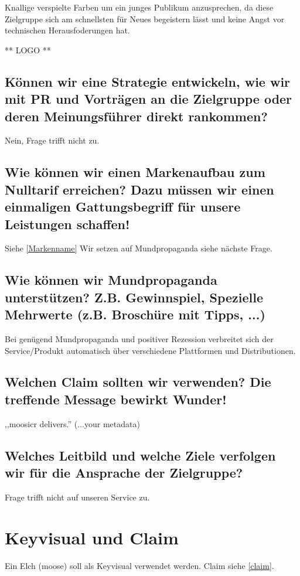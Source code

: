 \documentclass[11pt]{scrreprt}
\begin{document}
Knallige verspielte Farben um ein junges Publikum anzusprechen, da diese
Zielgruppe sich am schnellsten für Neues begeistern lässt und keine Angst vor
technischen Herausfoderungen hat.

** LOGO **

\section{Können wir eine Strategie entwickeln, wie wir
mit PR und Vorträgen an die Zielgruppe oder
deren Meinungsführer direkt rankommen?}

Nein, Frage trifft nicht zu.

\section{Wie können wir einen Markenaufbau zum Nulltarif
erreichen?
Dazu müssen wir einen einmaligen Gattungsbegriff
für unsere Leistungen schaffen!}

Siehe \ref{Markenname} 
Wir setzen auf Mundpropaganda siehe nächste Frage.

\section{Wie können wir Mundpropaganda
unterstützen?
Z.B. Gewinnspiel, Spezielle Mehrwerte (z.B.
Broschüre mit Tipps, ...)}
Bei genügend Mundpropaganda und positiver Rezession verbreitet sich der
Service/Produkt automatisch über verschiedene Plattformen und Distributionen.

\label{claim}\section{Welchen Claim sollten wir verwenden?
Die treffende Message bewirkt Wunder!}

,,moosicr delivers.'' (...your metadata)

\section{Welches Leitbild und welche Ziele verfolgen wir
für die Ansprache der Zielgruppe?}

Frage trifft nicht auf unseren Service zu.

\chapter{Keyvisual und Claim}
Ein Elch (moose) soll als Keyvisual verwendet werden. Claim siehe \ref{claim}.
\end{document}
